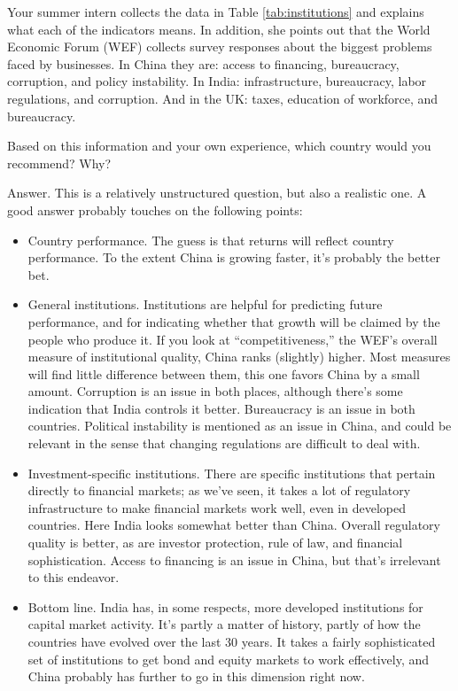 \begin{enumerate}
Your summer intern collects the data in Table \ref{tab:institutions}
and explains what each of the indicators means.
In addition, she points out that
the World Economic Forum (WEF) collects survey responses about
the biggest problems faced by businesses.
In China they are:  access to financing, bureaucracy, corruption, and policy instability.
In India:  infrastructure, bureaucracy, labor regulations, and corruption. And in the UK:  taxes, education of workforce, and bureaucracy.

Based on this information and your own experience,
which country would you recommend? Why?

Answer.
This is a relatively unstructured question,  but also a realistic one.
A good answer probably touches on the following points:
%
\begin{itemize}
\item Country performance.
The guess is that returns will reflect country performance.
To the extent China is growing faster,
it's probably the better bet.

\item General institutions.
Institutions are helpful for predicting future performance,
and for indicating whether that growth will be claimed
by the people who produce it.
If you look at ``competitiveness,'' the WEF's overall measure of
institutional quality, China ranks (slightly) higher.
Most measures will find little difference between them,
this one favors China by a small amount.
Corruption is an issue in both places, although there's
some indication that India controls it better.
Bureaucracy is an issue in both countries.
Political instability is mentioned as an issue in China,
and could be relevant in the sense that changing regulations
are difficult to deal with.

\item Investment-specific institutions.
There are specific institutions that pertain directly to financial
markets; as we've seen, it takes a lot of regulatory infrastructure
to make financial markets work well, even in developed countries.
Here India looks somewhat better than China.
Overall regulatory quality is better,
as are investor protection, rule of law, and financial sophistication. Access to financing is an issue in China,
but that's irrelevant to this endeavor.

\item Bottom line.
India has, in some respects, more developed
institutions for capital market activity.
It's partly a matter of history, partly of how the countries
have evolved over the last 30 years.
It takes a fairly sophisticated set of institutions to get
bond and equity markets to work effectively,
and China probably has further to go in this dimension right now.
\end{itemize}


\end{enumerate}
\setlength{\leftmargini}{\oldleftmargini}


